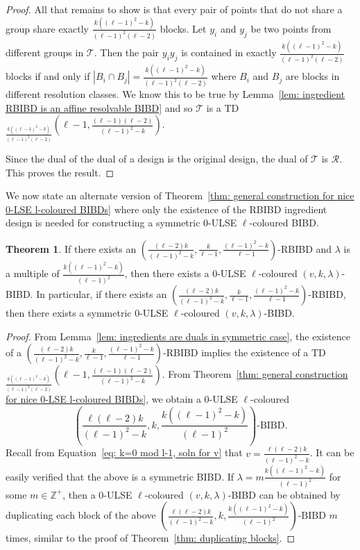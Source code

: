 \documentclass[12pt]{article}
\theoremstyle{definition}
\newtheorem{theorem}{Theorem}[section]
\begin{document}
\begin{proof}
    All that remains to show is that every pair of points that do not share a group share exactly $\frac{k((\ell-1)^2 - k)}{(\ell-1)^2(\ell-2)}$ blocks. Let $y_i$ and $y_j$ be two points from different groups in $\mathcal{T}$. Then the pair $y_i y_j$ is contained in exactly $\frac{k((\ell-1)^2 - k)}{(\ell-1)^2(\ell-2)}$ blocks if and only if $|B_i \cap B_j| = \frac{k((\ell-1)^2 - k)}{(\ell-1)^2(\ell-2)}$ where $B_i$ and $B_j$ are blocks in different resolution classes. We know this to be true by Lemma~\ref{lem: ingredient RBIBD is an affine resolvable BIBD} and so $\mathcal{T}$ is a TD$_{\frac{k((\ell-1)^2 - k)}{(\ell-1)^2(\ell-2)}}(\ell-1, \frac{(\ell-1)(\ell-2)}{(\ell-1)^2 - k})$. 

    Since the dual of the dual of a design is the original design, the dual of $\mathcal{T}$ is $\mathcal{R}$. This proves the result.
\end{proof}

We now state an alternate version of Theorem~\ref{thm: general construction for nice 0-LSE l-coloured BIBDs} where only the existence of the RBIBD ingredient design is needed for constructing a symmetric $0$-ULSE $\ell$-coloured BIBD.

\begin{theorem}
    If there exists an $\left(\frac{(\ell-2)k}{(\ell-1)^2 - k}, \frac{k}{\ell-1}, \frac{(\ell-1)^2 - k}{\ell-1}\right)$-RBIBD and $\lambda$ is a multiple of $\frac{k((\ell-1)^2 - k)}{(\ell-1)^2}$, then there exists a $0$-ULSE $\ell$-coloured $(v,k,\lambda)$-BIBD. In particular, if there exists an $\left(\frac{(\ell-2)k}{(\ell-1)^2 - k}, \frac{k}{\ell-1}, \frac{(\ell-1)^2 - k}{\ell-1}\right)$-RBIBD, then there exists a symmetric $0$-ULSE $\ell$-coloured $(v,k,\lambda)$-BIBD.
\end{theorem}

\begin{proof}
    From Lemma~\ref{lem: ingredients are duals in symmetric case}, the existence of a $\left(\frac{(\ell-2)k}{(\ell-1)^2 - k}, \frac{k}{\ell-1}, \frac{(\ell-1)^2 - k}{\ell-1}\right)$-RBIBD implies the existence of a TD$_{\frac{k((\ell-1)^2 - k)}{(\ell-1)^2(\ell-2)}}\left(\ell-1, \frac{(\ell-1)(\ell-2)}{(\ell-1)^2 - k}\right)$. From Theorem~\ref{thm: general construction for nice 0-LSE l-coloured BIBDs}, we obtain a $0$-ULSE $\ell$-coloured  \[\left(\frac{\ell(\ell-2)k}{(\ell-1)^2 - k}, k, \frac{k((\ell-1)^2 - k)}{(\ell-1)^2}\right)\!\text{-BIBD.}\] Recall from Equation~\eqref{eq: k=0 mod l-1, soln for v} that $v = \frac{\ell(\ell-2)k}{(\ell-1)^2 - k}$. It can be easily verified that the above is a symmetric BIBD. If $\lambda = m\frac{k((\ell-1)^2 - k)}{(\ell-1)^2}$ for some $m\in \mathbb{Z}^+$, then a $0$-ULSE $\ell$-coloured $(v,k,\lambda)$-BIBD can be obtained by duplicating each block of the above $\left(\frac{\ell(\ell-2)k}{(\ell-1)^2 - k}, k, \frac{k((\ell-1)^2 - k)}{(\ell-1)^2}\right)\!\text{-BIBD}$ $m$ times, similar to the proof of Theorem~\ref{thm: duplicating blocks}. 
\end{proof}
\end{document}
